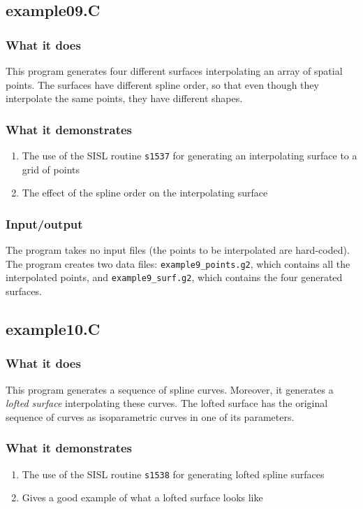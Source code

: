 \subsection{example09.C}

\subsubsection{What it does}
This program generates four different surfaces interpolating an array of spatial points.  
The surfaces have different spline order, so that even though they interpolate the same 
points, they have different shapes.
\subsubsection{What it demonstrates}
\begin{enumerate}
\item The use of the SISL routine \verb/s1537/ for generating an interpolating surface to a grid
of points
\item The effect of the spline order on the interpolating surface
\end{enumerate}
\subsubsection{Input/output}
The program takes no input files (the points to be interpolated are hard-coded). \\
The program creates two data files: \verb/example9_points.g2/, which contains all the 
interpolated points, and \verb/example9_surf.g2/, which contains the four generated
surfaces.

\subsection{example10.C}

\subsubsection{What it does}
This program generates a sequence of spline curves.  Moreover, it generates a \emph{lofted
surface} interpolating these curves.  The lofted surface has the original sequence of curves
as isoparametric curves in one of its parameters.
\subsubsection{What it demonstrates}
\begin{enumerate}
\item The use of the SISL routine \verb/s1538/ for generating lofted spline surfaces
\item Gives a good example of what a lofted surface looks like
\end{enumerate}
